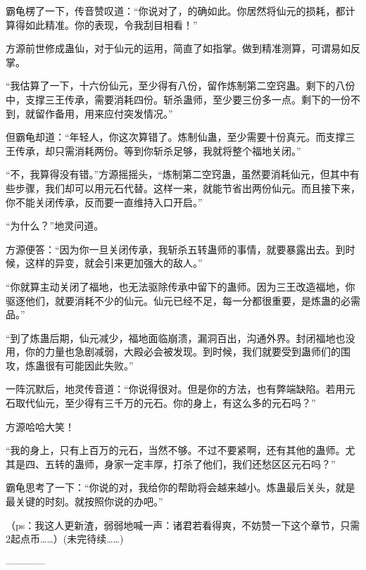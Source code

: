 \begin{this_body}
霸龟楞了一下，传音赞叹道：“你说对了，的确如此。你居然将仙元的损耗，都计算得如此精准。你的表现，令我刮目相看！”

方源前世修成蛊仙，对于仙元的运用，简直了如指掌。做到精准测算，可谓易如反掌。

“我估算了一下，十六份仙元，至少得有八份，留作炼制第二空窍蛊。剩下的八份中，支撑三王传承，需要消耗四份。斩杀蛊师，至少要三份多一点。剩下的一份不到，就留作备用，用来应付突发情况。”

但霸龟却道：“年轻人，你这次算错了。炼制仙蛊，至少需要十份真元。而支撑三王传承，却只需消耗两份。等到你斩杀足够，我就将整个福地关闭。”

“不，我算得没有错。”方源摇摇头，“炼制第二空窍蛊，虽然要消耗仙元，但其中有些步骤，我们却可以用元石代替。这样一来，就能节省出两份仙元。而且接下来，你不能关闭传承，反而要一直维持入口开启。”

“为什么？”地灵问道。

方源便答：“因为你一旦关闭传承，我斩杀五转蛊师的事情，就要暴露出去。到时候，这样的异变，就会引来更加强大的敌人。”

“你就算主动关闭了福地，也无法驱除传承中留下的蛊师。因为三王改造福地，你驱逐他们，就要消耗不少的仙元。仙元已经不足，每一分都很重要，是炼蛊的必需品。”

“到了炼蛊后期，仙元减少，福地面临崩溃，漏洞百出，沟通外界。封闭福地也没用，你的力量也急剧减弱，大殿必会被发现。到时候，我们就要受到蛊师们的围攻，炼蛊很有可能因此失败。”

一阵沉默后，地灵传音道：“你说得很对。但是你的方法，也有弊端缺陷。若用元石取代仙元，至少得有三千万的元石。你的身上，有这么多的元石吗？”

方源哈哈大笑！

“我的身上，只有上百万的元石，当然不够。不过不要紧啊，还有其他的蛊师。尤其是四、五转的蛊师，身家一定丰厚，打杀了他们，我们还愁区区元石吗？”

霸龟思考了一下：“你说的对，我给你的帮助将会越来越小。炼蛊最后关头，就是最关键的时刻。就按照你说的办吧。”

（ps：我这人更新渣，弱弱地喊一声：诸君若看得爽，不妨赞一下这个章节，只需2起点币……）(未完待续……)

------------

\end{this_body}


